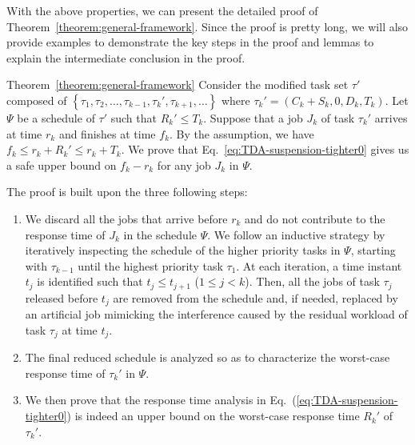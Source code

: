 With the above properties, we can present the detailed proof of
Theorem~\ref{theorem:general-framework}. Since the proof is pretty long, we 
will also provide examples to demonstrate the key steps in the proof and lemmas to explain the intermediate conclusion in the proof.

\begin{appProof}{Theorem~\ref{theorem:general-framework}}
Consider the modified task set $\tau'$ composed of $\left\{\tau_1, \tau_2, \ldots, \tau_{k-1}, \tau_k', \tau_{k+1}, \ldots \right\}$ where $\tau_k' = (C_k + S_k, 0, D_k, T_k)$. Let $\Psi$ be a schedule of $\tau'$ such that $R_k' \leq T_k$.  
Suppose that a job $J_{k}$ of task $\tau_k'$ arrives at time $r_k$ and finishes at time $f_k$. 
By the assumption, we have $f_k \leq r_k+R_k' \leq r_k+T_k$.
We prove that Eq.~\eqref{eq:TDA-suspension-tighter0} gives us a safe upper bound on $f_k-r_k$ for any job $J_k$ in $\Psi$.


The proof is built upon the three following steps:
\begin{enumerate}
\item We discard all the jobs that arrive before $r_k$ and do not contribute to the response time of $J_k$ in the schedule $\Psi$. We follow an inductive strategy by iteratively inspecting the schedule of the higher priority tasks in $\Psi$, starting with $\tau_{k-1}$ until the highest priority task $\tau_1$. At each iteration, a time instant $t_j$ is identified such that $t_j \leq t_{j+1}$ ($1 \leq j < k$). Then, all the jobs of task $\tau_j$ released before $t_j$ are removed from the schedule and, if needed, replaced by an artificial job mimicking the interference caused by the residual workload of task $\tau_j$ at time $t_j$. %
\item The final reduced schedule is analyzed so as to characterize the
  worst-case response time of $\tau_k'$ in $\Psi$. %
\item We then prove that the response time analysis in Eq.~(\ref{eq:TDA-suspension-tighter0}) is indeed an upper bound on the worst-case response time $R_k'$ of $\tau_k'$.
\end{enumerate}

  

\end{appProof}
